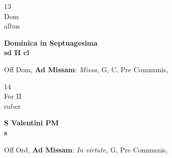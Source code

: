 \documentclass[10pt, openany]{book}
\begin{document}
        \begin{center}
            \begin{minipage}{3.5in}
                \vspace{2em}
                \begin{minipage}{0.5in}
                    {\Huge 13} \\
                    {\normalsize Dom} \\
                    {\normalsize albus}
                \end{minipage}
                \begin{minipage}{3.0in}
                    \textbf{ \large Dominica in Septuagesima \\
                    \textnormal{\normalsize sd II cl}} \\ 
                \end{minipage}
                \begin{justify}Off Dom, \textbf{Ad Missam}: \textit{Missa,} G, C, Pre Communis,   
                \end{justify}
            \end{minipage}
        \end{center}
    
        \begin{center}
            \begin{minipage}{3.5in}
                \vspace{2em}
                \begin{minipage}{0.5in}
                    {\Huge 14} \\
                    {\normalsize Fer II} \\
                    {\normalsize ruber}
                \end{minipage}
                \begin{minipage}{3.0in}
                    \textbf{ \large S Valentini PM \\
                    \textnormal{\normalsize s}} \\ 
                \end{minipage}
                \begin{justify}Off Ord, \textbf{Ad Missam}: \textit{In virtute,} G, Pre Communis,   
                \end{justify}
            \end{minipage}
        \end{center}
    
\end{document}
